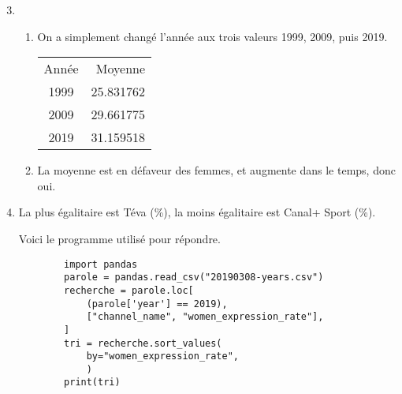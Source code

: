 \documentclass[12pt]{article}
\begin{document}
\begin{enumerate}
		\setcounter{enumi}{2}
	\item
		\begin{enumerate}
			\item On a simplement changé l'année aux trois valeurs 1999, 2009, puis 2019.
		\begin{center}\begin{tabular}{cn{2}{1}}
			\toprule
			Année & {Moyenne} \\
			1999 &    25.831762 \\
			2009 &    29.661775 \\
			2019 &    31.159518 \\
			\bottomrule
		\end{tabular}\end{center}
	\item La moyenne est en défaveur des femmes, et augmente dans le temps, donc oui.
		\end{enumerate}
	\item La plus égalitaire est Téva (\%), la moins égalitaire est Canal+ Sport (\%).

		Voici le programme utilisé pour répondre.

		\begin{lstlisting}
		import pandas
		parole = pandas.read_csv("20190308-years.csv")
		recherche = parole.loc[
			(parole['year'] == 2019),
			["channel_name", "women_expression_rate"],
		]
		tri = recherche.sort_values(
			by="women_expression_rate",
			)
		print(tri)
		\end{lstlisting}
\end{enumerate}
\end{document}
